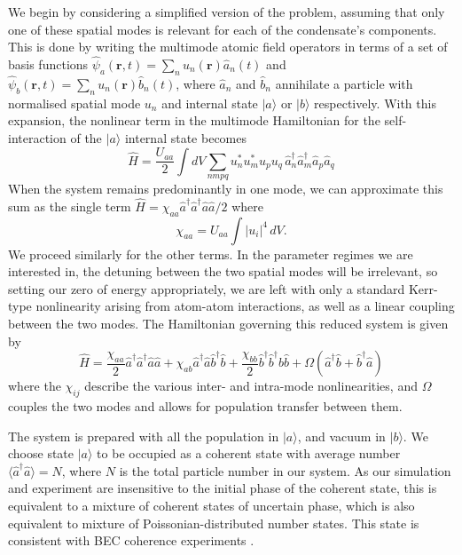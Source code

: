 \documentclass{iopart}
\begin{document}
We begin by considering a simplified version of the problem, assuming that only one of these spatial modes is relevant for each of the condensate's components.  This is done by writing the multimode atomic field operators in terms of a set of basis functions $\hat{\psi}_a({\mathbf{r}},t) = \sum_n u_{n}({\mathbf{r}}) \hat{a}_{n}(t)$ and $\hat{\psi}_b({\mathbf{r}},t) = \sum_n u_{n}({\mathbf{r}}) \hat{b}_{n}(t)$, where $\hat{a}_{n}$ and $\hat{b}_{n}$ annihilate a particle with normalised spatial mode $u_n$ and internal state $|a\rangle$ or $|b\rangle$ respectively. With this expansion, the nonlinear term in the multimode Hamiltonian for the self-interaction of the $|a\rangle$ internal state becomes
\begin{equation}
\hat{H} = \frac{U_{aa}}{2} \int dV \sum_{nmpq} u_n^* u_m^* u_p u_q \, \hat{a}^{\dagger}_{n} \hat{a}^{\dagger}_{m} \hat{a}_{p} \hat{a}_{q} 
\end{equation}
When the system remains predominantly in one mode, we can approximate this sum as the single term $\hat{H} = \chi_{aa} \hat{a}^{\dagger} \hat{a}^{\dagger} \hat{a} \hat{a}/2$ where
\begin{equation}
\chi_{aa} = U_{aa} \int |u_i|^4 \, dV.
\label{eqChiUequivalence}
\end{equation}
We proceed similarly for the other terms.  In the parameter regimes we are interested in, the detuning between the two spatial modes will be irrelevant, so setting our zero of energy appropriately, we are left with only a standard Kerr-type nonlinearity arising from atom-atom interactions, as well as a linear coupling between the two modes.  The Hamiltonian governing this reduced system is given by
\begin{equation}
\hat{H} = \frac{\chi_{aa}}{2} \hat{a}^{\dagger} \hat{a}^{\dagger} \hat{a} \hat{a}
          + \chi_{ab} \hat{a}^{\dagger} \hat{a} \hat{b}^{\dagger} \hat{b}
          + \frac{\chi_{bb}}{2} \hat{b}^{\dagger} \hat{b}^{\dagger} \hat{b} \hat{b}
          + \Omega (\hat{a}^{\dagger} \hat{b} + \hat{b}^{\dagger}  \hat{a} )
\label{eqTwoModeHamiltonian}
\end{equation}
where the $\chi_{ij}$ describe the various inter- and intra-mode nonlinearities, and $\Omega$ couples the two modes and allows for population transfer between them.

The system is prepared with all the population in $|a\rangle$, and vacuum in $|b\rangle$. We choose state $|a\rangle$ to be occupied as a coherent state with average number $\langle \hat{a}^{\dagger} \hat{a} \rangle = N$, where $N$ is the total particle number in our system.  As our simulation and experiment are insensitive to the initial phase of the coherent state, this is equivalent to a mixture of coherent states of uncertain phase, which is also equivalent to mixture of Poissonian-distributed number states.  This state is consistent with BEC coherence experiments \cite{Hadzibabic2004}.  
\end{document}
